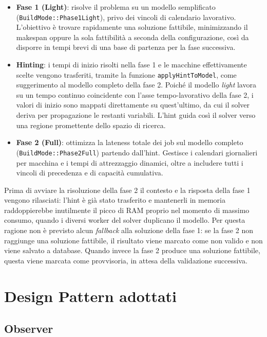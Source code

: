 \begin{itemize}
    \item \textbf{Fase 1 (Light)}: risolve il problema su un modello semplificato 
    \\ (\texttt{BuildMode::Phase1Light}), privo dei vincoli di calendario lavorativo. L'obiettivo è trovare rapidamente una soluzione fattibile, minimizzando il makespan oppure la sola fattibilità a seconda della configurazione, così da disporre in tempi brevi di una base di partenza per la fase successiva.
    \item \textbf{Hinting}: i tempi di inizio risolti nella fase 1 e le macchine effettivamente scelte vengono trasferiti, tramite la funzione \texttt{applyHintToModel}, come suggerimento al modello completo della fase 2. Poiché il modello \textit{light} lavora su un tempo continuo coincidente con l'asse tempo-lavorativo della fase 2, i valori di inizio sono mappati direttamente su quest'ultimo, da cui il solver deriva per propagazione le restanti variabili. L'hint guida così il solver verso una regione promettente dello spazio di ricerca.
    \item \textbf{Fase 2 (Full)}: ottimizza la lateness totale dei job sul modello completo (\texttt{BuildMode::Phase2Full}) partendo dall'hint. Gestisce i calendari giornalieri per macchina e i tempi di attrezzaggio dinamici, oltre a includere tutti i vincoli di precedenza e di capacità cumulativa.
\end{itemize}

Prima di avviare la risoluzione della fase 2 il contesto e la risposta della fase 1 vengono rilasciati: l'hint è già stato trasferito e mantenerli in memoria raddoppierebbe inutilmente il picco di RAM proprio nel momento di massimo consumo, quando i diversi worker del solver duplicano il modello. Per questa ragione non è previsto alcun \textit{fallback} alla soluzione della fase 1: se la fase 2 non raggiunge una soluzione fattibile, il risultato viene marcato come non valido e non viene salvato a database. Quando invece la fase 2 produce una soluzione fattibile, questa viene marcata come provvisoria, in attesa della validazione successiva.

\section{Design Pattern adottati}
\label{sec:design-pattern}

\subsection{Observer}
\label{subsec:observer}

